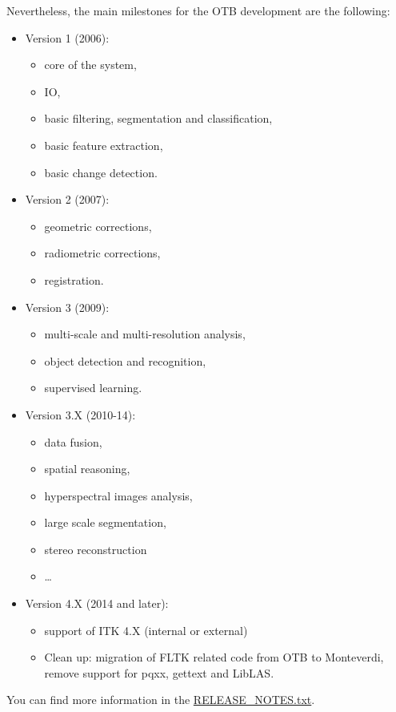 Nevertheless, the main milestones for the OTB development are the
following:
\begin{itemize}
  \item{Version 1 (2006):}
    \begin{itemize}
    \item core of the system,
    \item IO,
    \item basic filtering, segmentation and classification,
    \item basic feature extraction,
    \item basic change detection.
    \end{itemize}
    \item{Version 2 (2007):}
      \begin{itemize}
      \item geometric corrections,
      \item radiometric corrections,
      \item registration.
      \end{itemize}
    \item{Version 3 (2009):}
      \begin{itemize}
      \item multi-scale and multi-resolution analysis,
      \item object detection and recognition,
      \item supervised learning.
      \end{itemize}
    \item{Version 3.X (2010-14):}
      \begin{itemize}
	\item data fusion,
	\item spatial reasoning,
        \item hyperspectral images analysis,
        \item large scale segmentation,
        \item stereo reconstruction
        \item \ldots
      \end{itemize}
    \item{Version 4.X (2014 and later):}
      \begin{itemize}
	\item support of ITK 4.X (internal or external)
        \item Clean up: migration of FLTK related code from OTB to
          Monteverdi, remove support for pqxx, gettext and LibLAS.
      \end{itemize}

\end{itemize}

You can find more information in the \href{http://hg.orfeo-toolbox.org/OTB/file/b67d0bd93e34/RELEASE_NOTES.txt}{RELEASE\_NOTES.txt}.
